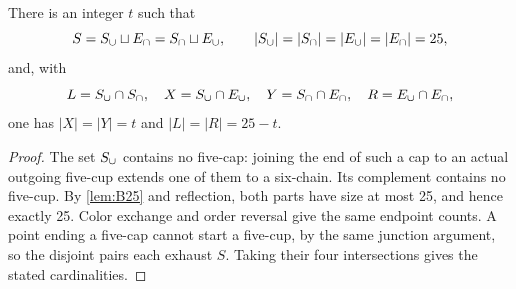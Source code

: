 \begin{lemma}\label{lem:equality}
There is an integer $t$ such that
\[
 S=S_{\cup}\sqcup E_{\cap}=S_{\cap}\sqcup E_{\cup},
 \qquad |S_{\cup}|=|S_{\cap}|=|E_{\cup}|=|E_{\cap}|=25,
\]
and, with
\[
 L=S_{\cup}\cap S_{\cap},\quad X=S_{\cup}\cap E_{\cup},
 \quad Y=S_{\cap}\cap E_{\cap},\quad R=E_{\cup}\cap E_{\cap},
\]
one has $|X|=|Y|=t$ and $|L|=|R|=25-t$.
\end{lemma}
\begin{proof}
The set $S_{\cup}$ contains no five-cap: joining the end of such a cap
to an actual outgoing five-cup extends one of them to a six-chain.
Its complement contains no five-cup. By \cref{lem:B25} and reflection,
both parts have size at most 25, and hence exactly 25. Color exchange
and order reversal give the same endpoint counts. A point ending a
five-cap cannot start a five-cup, by the same junction argument, so
the disjoint pairs each exhaust $S$. Taking their four intersections
gives the stated cardinalities.
\end{proof}

